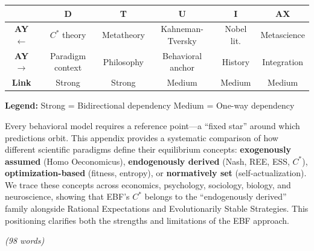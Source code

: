 \begin{tcolorbox}[colback=white, colframe=black,
    title=\textbf{Cross-Reference Map}]

\begin{center}
\small
\begin{tabular}{@{}c|ccccc@{}}
\toprule
& \textbf{D} & \textbf{T} & \textbf{U} & \textbf{I} & \textbf{AX} \\
\midrule
\textbf{AY $\leftarrow$} & $C^*$ theory & Metatheory & Kahneman-Tversky & Nobel lit. & Metascience \\
\textbf{AY $\rightarrow$} & Paradigm context & Philosophy & Behavioral anchor & History & Integration \\
\midrule
\textbf{Link} & \cellcolor{red!20}Strong & \cellcolor{red!20}Strong & \cellcolor{yellow!20}Medium & \cellcolor{yellow!20}Medium & \cellcolor{yellow!20}Medium \\
\bottomrule
\end{tabular}
\end{center}

\textbf{Legend:}
\colorbox{red!20}{Strong} = Bidirectional dependency \quad
\colorbox{yellow!20}{Medium} = One-way dependency

\end{tcolorbox}


\begin{tcolorbox}[colback=white, colframe=black,
    title=\textbf{Abstract}]

Every behavioral model requires a reference point---a ``fixed star'' around which
predictions orbit. This appendix provides a systematic comparison of how different
scientific paradigms define their equilibrium concepts: \textbf{exogenously assumed}
(Homo Oeconomicus), \textbf{endogenously derived} (Nash, REE, ESS, $C^*$),
\textbf{optimization-based} (fitness, entropy), or \textbf{normatively set}
(self-actualization). We trace these concepts across economics, psychology,
sociology, biology, and neuroscience, showing that EBF's $C^*$ belongs to the
``endogenously derived'' family alongside Rational Expectations and Evolutionarily
Stable Strategies. This positioning clarifies both the strengths and limitations
of the EBF approach.

\textit{(98 words)}

\end{tcolorbox}

